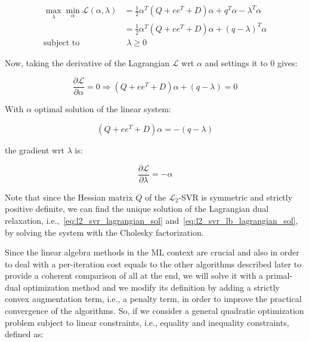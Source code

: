 \begin{equation} \label{eq:l2_svr_lb_lagrangian_dual}
	\begin{aligned}
    	\max_{\lambda} \min_{\alpha} \mathcal{L}(\alpha,\lambda) &= \frac{1}{2} \alpha^T (Q + ee^T + D) \alpha+q^T\alpha - \lambda^T \alpha \\
    &= \frac{1}{2} \alpha^T (Q + ee^T + D)\alpha + (q - \lambda)^T \alpha \\
    \text{subject to} \quad & \,\, \lambda \geq 0
	\end{aligned}
\end{equation}

Now, taking the derivative of the Lagrangian $\mathcal{L}$ wrt $\alpha$ and settings it to 0 gives:

\begin{equation} \label{eq:l2_svr_lb_lagrangian_der_a}
	\frac{\partial \mathcal{L}}{\partial \alpha}=0\Rightarrow (Q + ee^T + D) \alpha + (q - \lambda) = 0
\end{equation}

With $\alpha$ optimal solution of the linear system:

\begin{equation} \label{eq:l2_svr_lb_lagrangian_sol}
    (Q + ee^T + D) \alpha = - (q - \lambda)
\end{equation}

the gradient wrt $\lambda$ is:

\begin{equation} \label{eq:l2_svr_lb_lagrangian_der_l}
    \frac{\partial \mathcal{L}}{\partial \lambda}=-\alpha
\end{equation}

\bigskip

Note that since the Hessian matrix $Q$ of the $\mathcal{L}_2$-SVR is symmetric and strictly positive definite, we can find the unique solution of the Lagrangian dual relaxation, i.e.,~\ref{eq:l2_svr_lagrangian_sol} and~\ref{eq:l2_svr_lb_lagrangian_sol}, by solving the system with the Cholesky factorization.

\bigskip

Since the linear algebra methods in the ML context are crucial and also in order to deal with a per-iteration cost equals to the other algorithms described later to provide a coherent comparison of all at the end, we will solve it with a primal-dual optimization method and we modify its definition by adding a strictly convex augmentation term, i.e., a penalty term, in order to improve the practical convergence of the algorithms. So, if we consider a general quadratic optimization problem subject to linear constraints, i.e., equality and inequality constraints, defined as:


